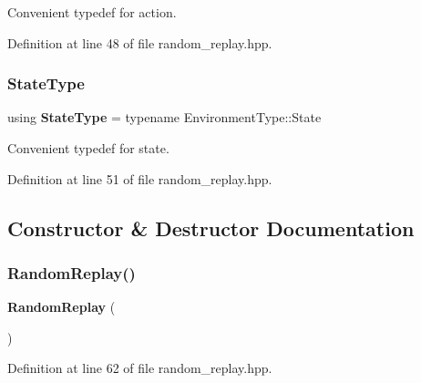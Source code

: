 Convenient typedef for action. 



Definition at line 48 of file random\+\_\+replay.\+hpp.

\mbox{\label{classmlpack_1_1rl_1_1RandomReplay_ada68ef405b7c331a2bee337614f00088}} 
\subsubsection{State\+Type}
{\footnotesize\ttfamily using \textbf{ State\+Type} =  typename Environment\+Type\+::\+State}



Convenient typedef for state. 



Definition at line 51 of file random\+\_\+replay.\+hpp.



\subsection{Constructor \& Destructor Documentation}
\mbox{\label{classmlpack_1_1rl_1_1RandomReplay_a63672681bb61c707da6ca94ada59164a}} 
\subsubsection{Random\+Replay()\hspace{0.1cm}{\footnotesize\ttfamily [1/2]}}
{\footnotesize\ttfamily \textbf{ Random\+Replay} (\begin{DoxyParamCaption}{ }\end{DoxyParamCaption})\hspace{0.3cm}{\ttfamily [inline]}}



Definition at line 62 of file random\+\_\+replay.\+hpp.

\mbox{\label{classmlpack_1_1rl_1_1RandomReplay_ad222f724aae50a27cb0f3f4f761cad01}} 
